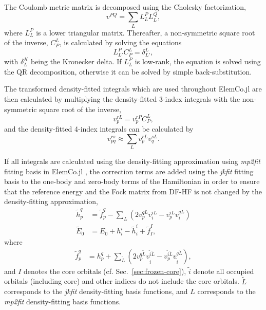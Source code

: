 \documentclass[a4paper,12pt,oneside]{book}
\newcommand{\sect}[1]{Sec.~\ref{#1}}
\newcommand{\ElemCojl}{\textsf{ElemCo.jl} }
\begin{document}
The Coulomb metric matrix is decomposed using the Cholesky factorization,
\begin{equation}
  v^{PQ} = \sum_L L^{P}_{L} L^{Q}_{L},
\end{equation}
where $L^{P}_{L}$ is a lower triangular matrix.
Thereafter, a non-symmetric square root of the inverse, $C_P^L$, is 
calculated by solving the equations
\begin{equation}
  L^{P}_{L'} C_{P}^{L} = \delta^{L}_{L'},
\end{equation}
with $\delta^{K}_{L}$ being the Kronecker delta. 
If $L^{P}_{L}$ is low-rank, the equation is solved using the QR decomposition,
otherwise it can be solved by simple back-substitution.

The transformed density-fitted integrals which are used throughout \ElemCojl 
are then calculated by multiplying the density-fitted 3-index 
integrals with the non-symmetric square root of the inverse,
\begin{equation}
  v_{p}^{rL} = v_{p}^{rP} C_P^L,
\end{equation}
and the density-fitted 4-index integrals can be calculated by
\begin{equation}
  v_{pq}^{rs} \approx \sum_L v_{p}^{rL} v_{q}^{sL}.
\end{equation}

If all integrals are calculated using the density-fitting approximation using \textit{mp2fit}
fitting basis in \ElemCojl,
the correction terms are added using the \textit{jkfit} fitting basis
to the one-body and zero-body terms of the Hamiltonian in order to ensure that the 
reference energy and the Fock matrix from DF-HF is not changed by the density-fitting approximation,
\begin{equation}
  \begin{aligned}
    \tilde h_p^q &= \tilde f_p^q 
    - \sum_L \left(2v_{p}^{qL} v_{i}^{iL} - v_{p}^{iL} v_{i}^{qL}\right)\\
    \tilde E_0 &= E_0 + h_i^i - \tilde h_i^i + \tilde f_I^I, 
  \end{aligned} 
\end{equation}
where 
\begin{equation}
  \begin{aligned}
    \tilde f_p^q &= h_p^q + \sum_{\tilde L} \left(2v_{p}^{q\tilde L} v_{\tilde i}^{\tilde i\tilde L} 
    - v_{p}^{\tilde i\tilde L} v_{\tilde i}^{q\tilde L}\right),
  \end{aligned} 
\end{equation}
and $I$ denotes the core orbitals (cf. \sect{sec:frozen-core}), 
$\tilde i$ denote all occupied orbitals (including core)
and other indices do not include the core orbitals.
$\tilde L$ corresponds to the \textit{jkfit} density-fitting basis functions,
and $L$ corresponds to the \textit{mp2fit} density-fitting basis functions.
\end{document}
